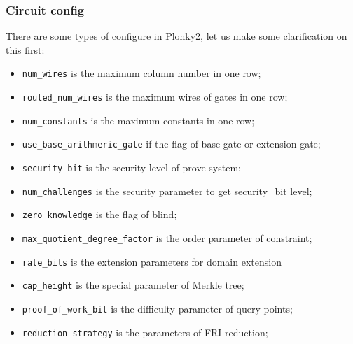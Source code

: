 \subsubsection{Circuit config} \label{sec:circuit-config}

There are some types of configure in Plonky2, let us make some clarification on this first:
\begin{itemize}
    \item \verb|num_wires| is the maximum column number in one row;
    \item \verb|routed_num_wires| is the maximum wires of gates in one row;
    \item \verb|num_constants| is the maximum constants in one row; 
    \item \verb|use_base_arithmeric_gate| if the flag of base gate or extension gate;
    \item \verb|security_bit| is the security level of prove system;
    \item \verb|num_challenges| is the security parameter to get security\_bit level;
    \item \verb|zero_knowledge| is the flag of blind;
    \item \verb|max_quotient_degree_factor| is the order parameter of constraint; 
    \item \verb|rate_bits| is the extension parameters for domain extension
    \item \verb|cap_height| is the special parameter of Merkle tree;
    \item \verb|proof_of_work_bit| is the difficulty parameter of query points;
    \item \verb|reduction_strategy| is the parameters of FRI-reduction;
\end{itemize}  


  
  
 
